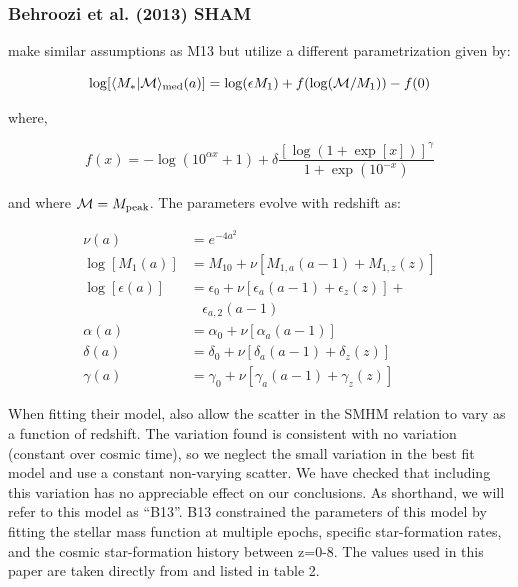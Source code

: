 \documentclass[a4paper,fleqn,usenatbib]{mnras}
\begin{document}
\subsubsection{Behroozi et al. (2013) SHAM}
\label{sec:b13}

\citet{Behroozi:2013fg} make similar assumptions as M13 but utilize a different parametrization given by:
%
\begin{linenomath}
\begin{equation}
\log[\langle M_*|\mathcal{M} \rangle_{\rm med}(a)] = \log(\epsilon M_1) + f(\log(\mathcal{M}/M_1)) - f(0)
\end{equation}
\end{linenomath}
%
where,
% 
\begin{linenomath}
\begin{equation}
f(x) = -\log(10^{\alpha x}+1) + \delta\frac{\left[ \log(1+\exp[x])\right]^{\gamma}}{1+\exp(10^{-x})}
\end{equation}
\end{linenomath}
%
and where $\mathcal{M} = M_{\rm peak}$.  The parameters evolve with redshift as:
%
\begin{linenomath}
\begin{align}
\nu(a) & = e^{-4a^2}  \\
\log[M_1(a)] & =  M_{10} + \nu\left[ M_{1,a}(a-1) + M_{1,z}(z) \right] \\
\log[\epsilon(a)] & = \epsilon_0 + \nu \left[\epsilon_a(a-1) +\epsilon_z (z) \right] + \\ \nonumber 
& ~~~~ \epsilon_{a,2}(a-1)  \\
\alpha(a) & =  \alpha_{0} + \nu\left[ \alpha_a(a-1)\right] \\
\delta(a) & =   \delta_{0} + \nu\left[ \delta_a(a-1) + \delta_z (z)\right] \\
\gamma(a) &= \gamma_{0} + \nu\left[ \gamma_a(a-1) + \gamma_z (z)\right]
\end{align}
\end{linenomath}
% 
When fitting their model, \cite{Behroozi:2013fg} also allow the scatter in the SMHM relation to vary as a function of redshift.  The variation found is consistent with no variation (constant over cosmic time), so we neglect the small variation in the best fit model and use a constant non-varying scatter.  We have checked that including this variation has no appreciable effect on our conclusions.   As shorthand, we will refer to this model as ``B13''.   B13 constrained the parameters of this model by fitting the stellar mass function at multiple epochs, specific star-formation rates, and the cosmic star-formation history between z=0-8.  The values used in this paper are taken directly from \cite{Behroozi:2013fg} and listed in table 2.
\end{document}
